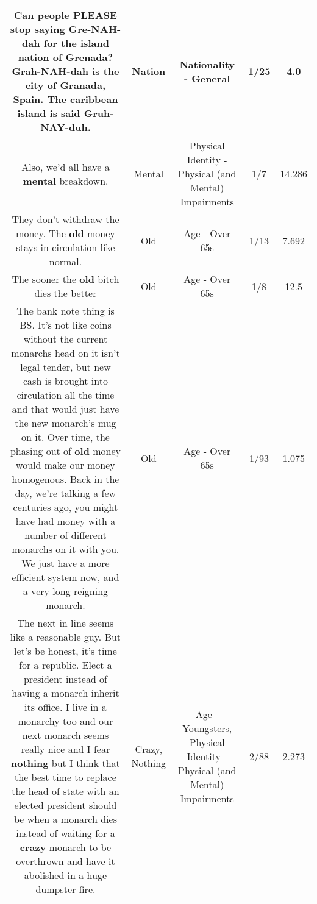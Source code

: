 \documentclass[11pt]{article}
\newlength\mylength
\begin{document}
\begin{center}
\begin{longtable}{|C{.65\mylength}|C{.30\mylength}|C{.12\mylength}|C{.12\mylength}|C{.12\mylength}|}
  \small Can people PLEASE stop saying Gre-NAH-dah for the island \textbf{nation} of Grenada? Grah-NAH-dah is the city of Granada, Spain. The caribbean island is said Gruh-NAY-duh.\normalsize   & Nation & Nationality - General & 1/25 & 4.0 \\  \hline
  \small Also, we'd all have a \textbf{mental} breakdown.\normalsize   & Mental & Physical Identity - Physical (and Mental) Impairments & 1/7 & 14.286 \\  \hline
  \small They don't withdraw the money.  The \textbf{old} money stays in circulation like normal.\normalsize   & Old & Age - Over 65s & 1/13 & 7.692 \\  \hline
  \small The sooner the \textbf{old} bitch dies the better\normalsize   & Old & Age - Over 65s & 1/8 & 12.5 \\  \hline
  \small The bank note thing is BS. It's not like coins without the current monarchs head on it isn't legal tender, but new cash is brought into circulation all the time and that would just have the new monarch's mug on it. Over time, the phasing out of \textbf{old} money would make our money homogenous. Back in the day, we're talking a few centuries ago, you might have had money with a number of different monarchs on it with you. We just have a more efficient system now, and a very long reigning monarch.\normalsize   & Old & Age - Over 65s & 1/93 & 1.075 \\  \hline
  \small The next in line seems like a reasonable guy. But let's be honest, it's time for a republic. Elect a president instead of having a monarch inherit its office. I live in a monarchy too and our next monarch seems really nice and I fear \textbf{nothing} but I think that the best time to replace the head of state with an elected president should be when a monarch dies instead of waiting for a \textbf{crazy} monarch to be overthrown and have it abolished in a huge dumpster fire.\normalsize   & Crazy, Nothing & Age - Youngsters, Physical Identity - Physical (and Mental) Impairments & 2/88 & 2.273 \\  \hline

\end{longtable}
\end{center}
\end{document}
